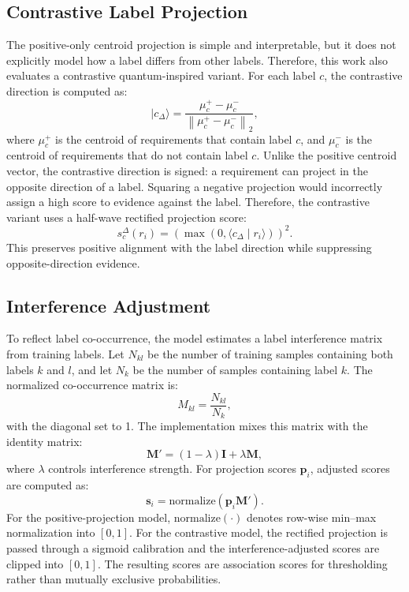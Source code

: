 \documentclass[runningheads]{llncs}
\begin{document}
\subsection{Contrastive Label Projection}
The positive-only centroid projection is simple and interpretable, but it does
not explicitly model how a label differs from other labels. Therefore, this
work also evaluates a contrastive quantum-inspired variant. For each label $c$,
the contrastive direction is computed as:
\begin{equation}
    \lvert c_{\Delta} \rangle =
    \frac{\mu_c^{+} - \mu_c^{-}}
    {\left\|\mu_c^{+} - \mu_c^{-}\right\|_2},
\end{equation}
where $\mu_c^{+}$ is the centroid of requirements that contain label $c$, and
$\mu_c^{-}$ is the centroid of requirements that do not contain label $c$.
Unlike the positive centroid vector, the contrastive direction is signed: a
requirement can project in the opposite direction of a label. Squaring a
negative projection would incorrectly assign a high score to evidence against
the label. Therefore, the contrastive variant uses a half-wave rectified
projection score:
\begin{equation}
    s^{\Delta}_c(r_i) =
    \left(\max(0,\langle c_{\Delta}\mid r_i\rangle)\right)^2.
\end{equation}
This preserves positive alignment with the label direction while suppressing
opposite-direction evidence.

\subsection{Interference Adjustment}
To reflect label co-occurrence, the model estimates a label interference matrix
from training labels. Let $N_{kl}$ be the number of training samples containing
both labels $k$ and $l$, and let $N_k$ be the number of samples containing label
$k$. The normalized co-occurrence matrix is:
\begin{equation}
    M_{kl} = \frac{N_{kl}}{N_k},
\end{equation}
with the diagonal set to 1. The implementation mixes this matrix with the
identity matrix:
\begin{equation}
    \mathbf{M}' = (1-\lambda)\mathbf{I} + \lambda\mathbf{M},
\end{equation}
where $\lambda$ controls interference strength. For projection scores
$\mathbf{p}_i$, adjusted scores are computed as:
\begin{equation}
    \mathbf{s}_i = \mathrm{normalize}(\mathbf{p}_i \mathbf{M}').
\end{equation}
For the positive-projection model, $\mathrm{normalize}(\cdot)$ denotes row-wise
min--max normalization into $[0,1]$. For the contrastive model, the rectified
projection is passed through a sigmoid calibration and the interference-adjusted
scores are clipped into $[0,1]$. The resulting scores are association scores
for thresholding rather than mutually exclusive probabilities.
\end{document}
